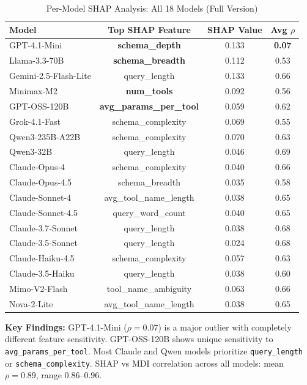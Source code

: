 \documentclass[sigconf,anonymous,review]{acmart}
\begin{document}
\begin{table}[h]
\centering
\caption{Per-Model SHAP Analysis: All 18 Models (Full Version)}
\label{tab:permodel_shap_full}
\small
\begin{tabular}{@{}lccc@{}}
\toprule
\textbf{Model} & \textbf{Top SHAP Feature} & \textbf{SHAP Value} & \textbf{Avg $\rho$} \\
\midrule
GPT-4.1-Mini & \textbf{schema\_depth} & 0.133 & \textbf{0.07} \\
Llama-3.3-70B & \textbf{schema\_breadth} & 0.112 & 0.53 \\
Gemini-2.5-Flash-Lite & query\_length & 0.133 & 0.66 \\
Minimax-M2 & \textbf{num\_tools} & 0.092 & 0.56 \\
GPT-OSS-120B & \textbf{avg\_params\_per\_tool} & 0.059 & 0.62 \\
Grok-4.1-Fast & schema\_complexity & 0.069 & 0.55 \\
Qwen3-235B-A22B & schema\_complexity & 0.070 & 0.63 \\
Qwen3-32B & query\_length & 0.046 & 0.69 \\
Claude-Opus-4 & schema\_complexity & 0.040 & 0.66 \\
Claude-Opus-4.5 & schema\_breadth & 0.035 & 0.58 \\
Claude-Sonnet-4 & avg\_tool\_name\_length & 0.038 & 0.65 \\
Claude-Sonnet-4.5 & query\_word\_count & 0.040 & 0.65 \\
Claude-3.7-Sonnet & query\_length & 0.038 & 0.68 \\
Claude-3.5-Sonnet & query\_length & 0.024 & 0.68 \\
Claude-Haiku-4.5 & schema\_complexity & 0.057 & 0.63 \\
Claude-3.5-Haiku & query\_length & 0.038 & 0.60 \\
Mimo-V2-Flash & tool\_name\_ambiguity & 0.063 & 0.66 \\
Nova-2-Lite & avg\_tool\_name\_length & 0.038 & 0.65 \\
\bottomrule
\end{tabular}
\end{table}

\textbf{Key Findings:} GPT-4.1-Mini ($\rho=0.07$) is a major outlier with completely different feature sensitivity. GPT-OSS-120B shows unique sensitivity to \texttt{avg\_params\_per\_tool}. Most Claude and Qwen models prioritize \texttt{query\_length} or \texttt{schema\_complexity}. SHAP vs MDI correlation across all models: mean $\rho=0.89$, range 0.86--0.96.
\end{document}
